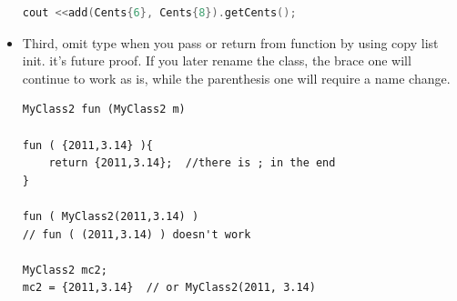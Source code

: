 \documentclass[a4paper,11pt,twoside]{book}
\begin{document}
\begin{itemize}
\begin{lstlisting}[frame=single, language=c++]
cout <<add(Cents{6}, Cents{8}).getCents();
\end{lstlisting}

\item Third, omit type when you pass or return from function by using copy list init. it's future proof. If you later rename the class, the brace one will continue to work as is, while the parenthesis one will require a name change.

\begin{lstlisting}
MyClass2 fun (MyClass2 m) 

fun ( {2011,3.14} ){
	return {2011,3.14};  //there is ; in the end
}

fun ( MyClass2(2011,3.14) ) 
// fun ( (2011,3.14) ) doesn't work

MyClass2 mc2;
mc2 = {2011,3.14}  // or MyClass2(2011, 3.14)
\end{lstlisting}


\end{itemize}
\end{document}
